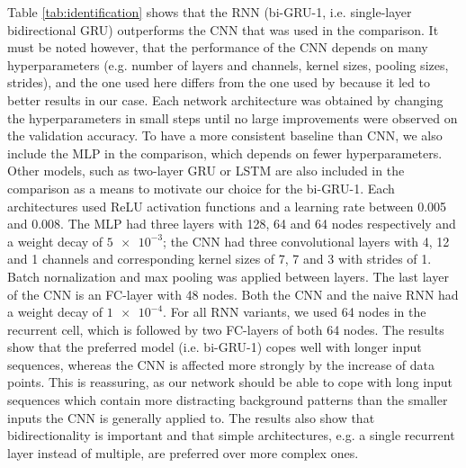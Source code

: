 Table \ref{tab:identification} shows that the RNN (bi-GRU-1, i.e. single-layer bidirectional GRU) outperforms the CNN that was used in the comparison. It must be noted however, that the performance of the CNN depends on many hyperparameters (e.g. number of layers and channels, kernel sizes, pooling sizes, strides), and the one used here differs from the one used by \cite{pearson2018searching} because it led to better results in our case. Each network architecture was obtained by changing the hyperparameters in small steps until no large improvements were observed on the validation accuracy. To have a more consistent baseline than CNN, we also include the MLP in the comparison, which depends on fewer hyperparameters. Other models, such as two-layer GRU or LSTM are also included in the comparison as a means to motivate our choice for the bi-GRU-1. Each architectures used ReLU activation functions and a learning rate between 0.005 and 0.008. The MLP had three layers with 128, 64 and 64 nodes respectively and a weight decay of $\num{5e-3}$; the CNN had three convolutional layers with 4, 12 and 1 channels and corresponding kernel sizes of  7, 7 and 3 with strides of 1. Batch nornalization and max pooling was applied between layers. The last layer of the CNN is an FC-layer with 48 nodes. Both the CNN and the naive RNN had a weight decay of $\num{1e-4}$. For all RNN variants, we used 64 nodes in the recurrent cell, which is followed by two FC-layers of both 64 nodes. The results show that the preferred model (i.e. bi-GRU-1) copes well with longer input sequences, whereas the CNN is affected more strongly by the increase of data points. This is reassuring, as our network should be able to cope with long input sequences which contain more distracting background patterns than the smaller inputs the CNN is generally applied to. The results also show that bidirectionality is important and that simple architectures, e.g. a single recurrent layer instead of multiple, are preferred over more complex ones.

